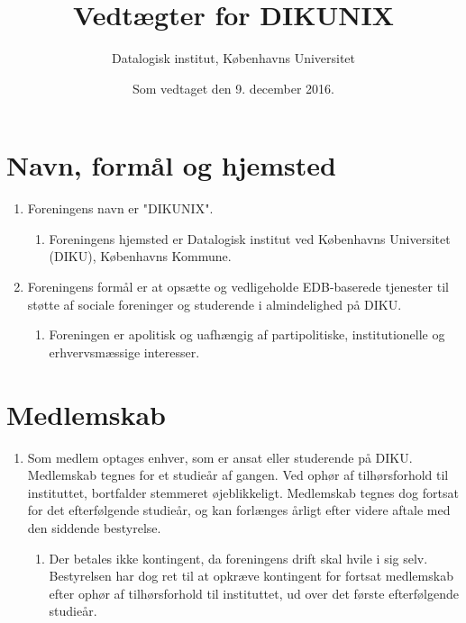 \documentclass[a4paper]{article}
\title{Vedtægter for DIKUNIX}
\author{Datalogisk institut, Københavns Universitet}
\date{Som vedtaget den 9. december 2016.}
\newenvironment{afsnitenum}{
  \begin{enumerate}[series=afsnit, %
    label=\textsection~\arabic*., ref=\arabic*]%
}{\end{enumerate}}
\newenvironment{stykenum}{
  \begin{enumerate}[%
    label=Stk.~\arabic*., ref=\textsection~\theenumi~Stk.~\arabic*, start=2]
}{\end{enumerate}}
\begin{document}
\maketitle
\thispagestyle{first}

\section*{Navn, formål og hjemsted}

\begin{afsnitenum}

\item \label{navn} Foreningens navn er "DIKUNIX".

  \begin{stykenum}

  \item Foreningens hjemsted er Datalogisk institut ved Københavns Universitet
        (DIKU), Københavns Kommune.

  \end{stykenum}

\item \label{formaal} Foreningens formål er at opsætte og vedligeholde
EDB-baserede tjenester til støtte af sociale foreninger og studerende i
almindelighed på DIKU.

  \begin{stykenum}

  \item Foreningen er apolitisk og uafhængig af partipolitiske,
        institutionel\-le og erhvervsmæssige interesser.

  \end{stykenum}

\end{afsnitenum}


\section*{Medlemskab}

\begin{enumerate}[resume*=afsnit]

\item Som medlem optages enhver, som er ansat eller studerende på DIKU.
Medlemskab tegnes for et studieår af gangen. Ved ophør af tilhørsforhold til
instituttet, bortfalder stemmeret øjeblikkeligt.  Medlemskab tegnes dog fortsat
for det efterfølgende studieår, og kan forlænges årligt efter videre aftale med
den siddende bestyrelse.

  \begin{stykenum}

  \item Der betales ikke kontingent, da foreningens drift skal hvile i sig
        selv.  Bestyrelsen har dog ret til at opkræve kontingent for fortsat
        medlemskab efter ophør af tilhørsforhold til instituttet, ud over
        det første efterfølgende studieår.

\end{stykenum}

\end{enumerate}
\end{document}
